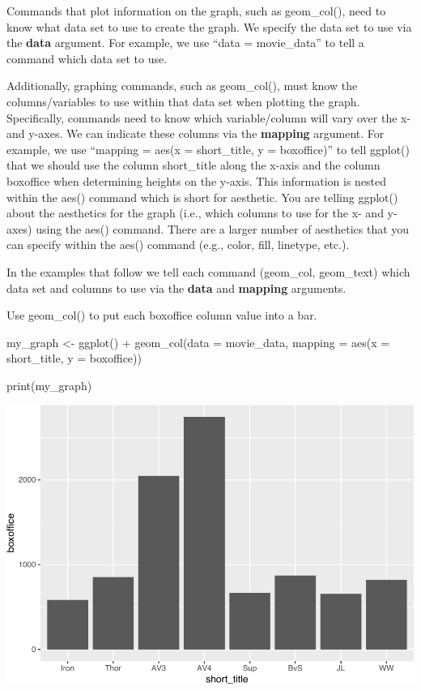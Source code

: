 \documentclass[
]{krantz}
\makeatletter
\newenvironment{Shaded}{\begin{snugshade}}{\end{snugshade}}
\newcommand{\AttributeTok}[1]{\textcolor[rgb]{0.61,0.61,0.61}{#1}}
\newcommand{\FunctionTok}[1]{\textcolor[rgb]{0,0,0}{#1}}
\newcommand{\NormalTok}[1]{#1}
\newcommand{\OtherTok}[1]{\textcolor[rgb]{0.37,0.37,0.37}{#1}}
\newcommand{\SpecialCharTok}[1]{\textcolor[rgb]{0,0,0}{#1}}
\newenvironment{kframe}{%
\medskip{}
\setlength{\fboxsep}{.8em}
 \def\at@end@of@kframe{}%
 \ifinner\ifhmode%
  \def\at@end@of@kframe{\end{minipage}}%
  \begin{minipage}{\columnwidth}%
 \fi\fi%
 \def\FrameCommand##1{\hskip\@totalleftmargin \hskip-\fboxsep
 \colorbox{shadecolor}{##1}\hskip-\fboxsep
     \hskip-\linewidth \hskip-\@totalleftmargin \hskip\columnwidth}%
 \MakeFramed {\advance\hsize-\width
   \@totalleftmargin\z@ \linewidth\hsize
   \@setminipage}}%
 {\par\unskip\endMakeFramed%
 \at@end@of@kframe}
\renewenvironment{Shaded}{\begin{kframe}}{\end{kframe}}
\makeatother
\begin{document}
Commands that plot information on the graph, such as geom\_col(), need to know what data set to use to create the graph. We specify the data set to use via the \textbf{data} argument. For example, we use ``data = movie\_data'' to tell a command which data set to use.

Additionally, graphing commands, such as geom\_col(), must know the columns/variables to use within that data set when plotting the graph. Specifically, commands need to know which variable/column will vary over the x- and y-axes. We can indicate these columns via the \textbf{mapping} argument. For example, we use ``mapping = aes(x = short\_title, y = boxoffice)'' to tell ggplot() that we should use the column short\_title along the x-axis and the column boxoffice when determining heights on the y-axis. This information is nested within the aes() command which is short for aesthetic. You are telling ggplot() about the aesthetics for the graph (i.e., which columns to use for the x- and y-axes) using the aes() command. There are a larger number of aesthetics that you can specify within the aes() command (e.g., color, fill, linetype, etc.).

In the examples that follow we tell each command (geom\_col, geom\_text) which data set and columns to use via the \textbf{data} and \textbf{mapping} arguments.

Use geom\_col() to put each boxoffice column value into a bar.

\begin{Shaded}
\begin{Highlighting}[]
\NormalTok{my\_graph }\OtherTok{\textless{}{-}} \FunctionTok{ggplot}\NormalTok{() }\SpecialCharTok{+}
  \FunctionTok{geom\_col}\NormalTok{(}\AttributeTok{data =}\NormalTok{ movie\_data,}
           \AttributeTok{mapping =} \FunctionTok{aes}\NormalTok{(}\AttributeTok{x =}\NormalTok{ short\_title, }
                         \AttributeTok{y =}\NormalTok{ boxoffice))}

\FunctionTok{print}\NormalTok{(my\_graph)}
\end{Highlighting}
\end{Shaded}

\includegraphics[width=0.65\linewidth]{bookdown_files/figure-latex/unnamed-chunk-106-1}
\end{document}
